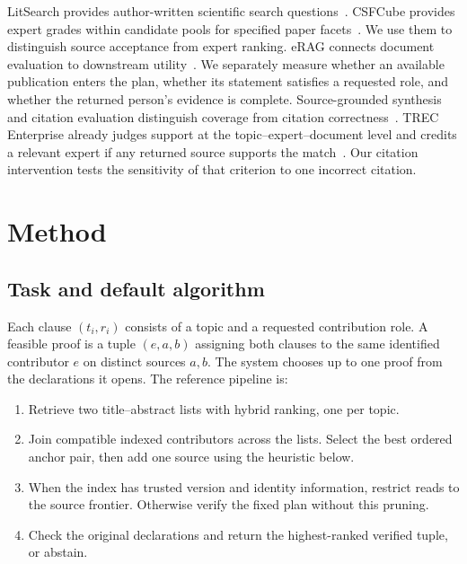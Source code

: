 \documentclass[sigconf,natbib=true,anonymous=true,pbalance=true]{acmart}
\begin{document}
LitSearch provides author-written scientific search questions~\cite{ajith2024litsearch}. CSFCube provides expert grades within candidate pools for specified paper facets~\cite{mysore2021csfcube}. We use them to distinguish source acceptance from expert ranking. eRAG connects document evaluation to downstream utility~\cite{salemi2024erag}. We separately measure whether an available publication enters the plan, whether its statement satisfies a requested role, and whether the returned person's evidence is complete. Source-grounded synthesis and citation evaluation distinguish coverage from citation correctness~\cite{lin2025scirgen,gao2023alce,xu2025citeeval}. TREC Enterprise already judges support at the topic--expert--document level and credits a relevant expert if any returned source supports the match~\cite{soboroff2006enterprise}. Our citation intervention tests the sensitivity of that criterion to one incorrect citation.

\section{Method}
\label{sec:method}
\subsection{Task and default algorithm}
Each clause $(t_i,r_i)$ consists of a topic and a requested contribution role. A feasible proof is a tuple $(e,a,b)$ assigning both clauses to the same identified contributor $e$ on distinct sources $a,b$. The system chooses up to one proof from the declarations it opens. The reference pipeline is:
\begin{enumerate}
\item Retrieve two title--abstract lists with hybrid ranking, one per topic.
\item Join compatible indexed contributors across the lists. Select the best ordered anchor pair, then add one source using the heuristic below.
\item When the index has trusted version and identity information, restrict reads to the source frontier. Otherwise verify the fixed plan without this pruning.
\item Check the original declarations and return the highest-ranked verified tuple, or abstain.
\end{enumerate}
\end{document}
